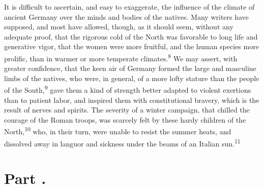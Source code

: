 It is difficult to ascertain, and easy to exaggerate, the
influence of the climate of ancient Germany over the minds and
bodies of the natives. Many writers have supposed, and most have
allowed, though, as it should seem, without any adequate proof,
that the rigorous cold of the North was favorable to long life
and generative vigor, that the women were more fruitful, and the
human species more prolific, than in warmer or more temperate
climates.\textsuperscript{8} We may assert, with greater confidence, that the keen
air of Germany formed the large and masculine limbs of the
natives, who were, in general, of a more lofty stature than the
people of the South,\textsuperscript{9} gave them a kind of strength better
adapted to violent exertions than to patient labor, and inspired
them with constitutional bravery, which is the result of nerves
and spirits. The severity of a winter campaign, that chilled the
courage of the Roman troops, was scarcely felt by these hardy
children of the North,\textsuperscript{10} who, in their turn, were unable to
resist the summer heats, and dissolved away in languor and
sickness under the beams of an Italian sun.\textsuperscript{11}





\section{Part \thesection.}

